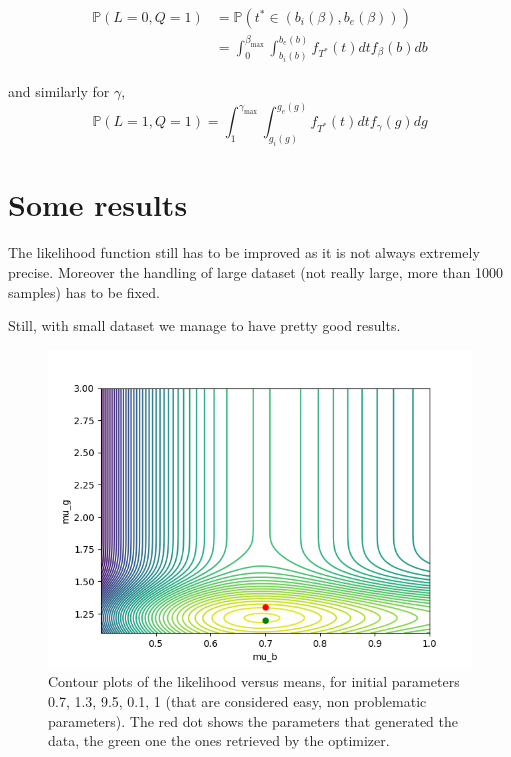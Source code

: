 \documentclass{article}
\begin{document}
\begin{align}
  \label{eq:prob_int_beta}
  \begin{split}
    \mathbb{P}(L=0, Q=1) & =\mathbb{P}(t^* \in (b_i(\beta), b_e(\beta))) \\
    & = \int_0^{\beta_\text{max}}\int_{b_i(b)}^{b_e(b)} f_{T^*}(t)dtf_\beta(b)db
      \end{split}
\end{align}

and similarly for \(\gamma\),
\begin{equation}
  \label{eq:prob_in_gamma}
  \mathbb{P}(L=1, Q=1) = \int_1^{\gamma_\text{max}}\int_{g_i(g)}^{g_e(g)} f_{T^*}(t)dtf_\gamma(g)dg
\end{equation}

\section{Some results}

The likelihood function still has to be improved as it is not always extremely precise. Moreover the handling of large dataset (not really large, more than 1000 samples) has to be fixed.

Still, with small dataset we manage to have pretty good results.

\begin{figure}
  \centering
  \includegraphics[width=.8\textwidth]{img/contour_mus.png}
  \caption{Contour plots of the likelihood versus means, for initial parameters 0.7, 1.3, 9.5, 0.1, 1 (that are considered easy, non problematic parameters). The red dot shows the parameters that generated the data, the green one the ones retrieved by the optimizer.}
  \label{fig:easy_par}
\end{figure}
\end{document}
